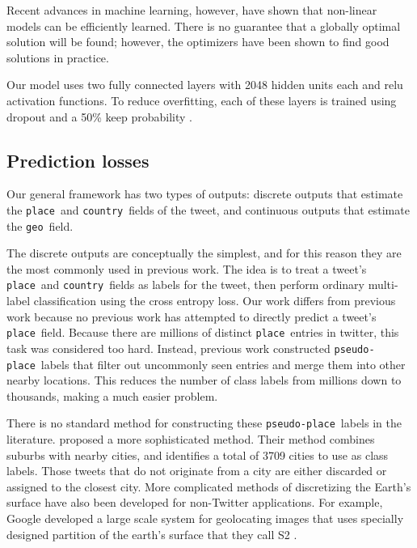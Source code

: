 \documentclass{article}
\newcommand{\tweetdata}[1]{{\texttt{#1}~}}
\newcommand{\place        }{\tweetdata{place}}
\newcommand{\pseudoplace  }{\tweetdata{pseudo-place}}
\newcommand{\country      }{\tweetdata{country}}
\newcommand{\geo          }{\tweetdata{geo}}
\begin{document}
Recent advances in machine learning, however, have shown that non-linear models can be efficiently learned.
There is no guarantee that a globally optimal solution will be found;
however, the optimizers have been shown to find good solutions in practice.

Our model uses two fully connected layers with 2048 hidden units each and relu activation functions.
To reduce overfitting, each of these layers is trained using dropout and a 50\% keep probability \citep{}.

\subsection{Prediction losses}

Our general framework has two types of outputs:
discrete outputs that estimate the \place and \country fields of the tweet,
and continuous outputs that estimate the \geo field.

The discrete outputs are conceptually the simplest,
and for this reason they are the most commonly used in previous work.
The idea is to treat a tweet's \place and \country fields as labels for the tweet,
then perform ordinary multi-label classification using the cross entropy loss.
Our work differs from previous work because no previous work has attempted to directly predict a tweet's \place field.
Because there are millions of distinct \place entries in twitter,
this task was considered too hard.
Instead, previous work constructed \pseudoplace labels that filter out uncommonly seen entries and merge them into other nearby locations.
This reduces the number of class labels from millions down to thousands,
making a much easier problem.

There is no standard method for constructing these \pseudoplace labels in the literature.
\citet{han2012geolocation} proposed a more sophisticated method.
Their method combines suburbs with nearby cities,
and identifies a total of 3709 cities to use as class labels.
Those tweets that do not originate from a city are either discarded or assigned to the closest city.
More complicated methods of discretizing the Earth's surface have also been developed for non-Twitter applications.
For example, Google developed a large scale system for geolocating images that uses specially designed partition of the earth's surface that they call S2 \citep{weyand2016planet}.
\end{document}
